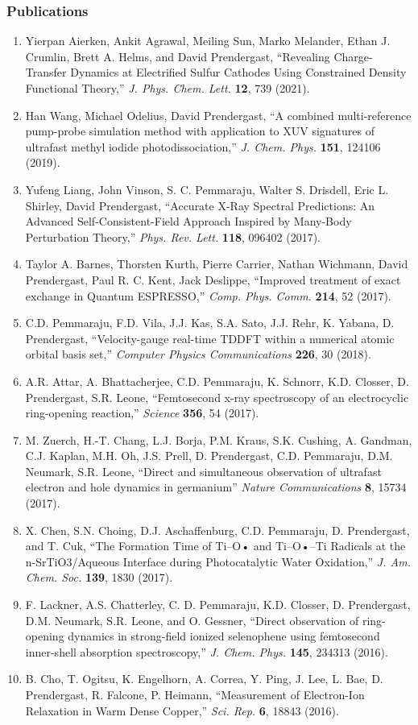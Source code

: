 \subsubsection*{Publications}
\begin{enumerate}
    \item Yierpan Aierken, Ankit Agrawal, Meiling Sun, Marko Melander, Ethan J. Crumlin, Brett A. Helms, and David Prendergast, “Revealing Charge-Transfer Dynamics at Electrified Sulfur Cathodes Using Constrained Density Functional Theory,” {\it J. Phys. Chem. Lett.} {\bf 12}, 739 (2021).
    \item Han Wang, Michael Odelius, David Prendergast, “A combined multi-reference pump-probe simulation method with application to XUV signatures of ultrafast methyl iodide photodissociation,” {\it J. Chem. Phys.} {\bf 151}, 124106 (2019).
    \item Yufeng Liang, John Vinson, S. C. Pemmaraju, Walter S. Drisdell, Eric L. Shirley, David Prendergast, “Accurate X-Ray Spectral Predictions: An Advanced Self-Consistent-Field Approach Inspired by Many-Body Perturbation Theory,” {\it Phys. Rev. Lett.} {\bf 118}, 096402 (2017).
    \item Taylor A. Barnes, Thorsten Kurth, Pierre Carrier, Nathan Wichmann, David Prendergast, Paul R. C. Kent, Jack Deslippe, “Improved treatment of exact exchange in Quantum ESPRESSO,” {\it Comp. Phys. Comm.} {\bf 214}, 52 (2017).
    \item C.D. Pemmaraju, F.D. Vila, J.J. Kas, S.A. Sato, J.J. Rehr, K. Yabana, D. Prendergast, “Velocity-gauge real-time TDDFT within a numerical atomic orbital basis set,” {\it Computer Physics Communications} {\bf 226}, 30 (2018).
    \item A.R. Attar, A. Bhattacherjee, C.D. Pemmaraju, K. Schnorr, K.D. Closser, D. Prendergast, S.R. Leone, “Femtosecond x-ray spectroscopy of an electrocyclic ring-opening reaction,” {\it Science} {\bf 356}, 54 (2017).
    \item M. Zuerch, H.-T. Chang, L.J. Borja, P.M. Kraus, S.K. Cushing, A. Gandman, C.J. Kaplan, M.H. Oh, J.S. Prell, D. Prendergast, C.D. Pemmaraju, D.M. Neumark, S.R. Leone, “Direct and simultaneous observation of ultrafast electron and hole dynamics in germanium” {\it Nature Communications} {\bf 8}, 15734 (2017).
    \item X. Chen, S.N. Choing, D.J. Aschaffenburg, C.D. Pemmaraju, D. Prendergast, and T. Cuk, “The Formation Time of Ti–O• and Ti–O•–Ti Radicals at the n-SrTiO3/Aqueous Interface during Photocatalytic Water Oxidation,” {\it J. Am. Chem. Soc.} {\bf 139}, 1830 (2017).
    \item F. Lackner, A.S. Chatterley, C. D. Pemmaraju, K.D. Closser, D. Prendergast, D.M. Neumark, S.R. Leone, and O. Gessner, “Direct observation of ring-opening dynamics in strong-field ionized selenophene using femtosecond inner-shell absorption spectroscopy,” {\it J. Chem. Phys.} {\bf 145}, 234313 (2016). 
    \item B. Cho, T. Ogitsu, K. Engelhorn, A. Correa, Y. Ping, J. Lee, L. Bae, D. Prendergast, R. Falcone, P. Heimann, “Measurement of Electron-Ion Relaxation in Warm Dense Copper,” {\it Sci. Rep.} {\bf 6}, 18843 (2016).
\end{enumerate}

